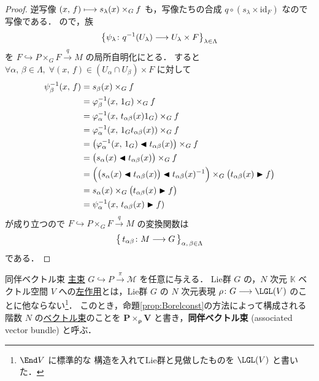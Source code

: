 \documentclass[geometry_main]{subfiles}
\begin{document}
\begin{proof}
{        逆写像 $(x,\, f) \longmapsto s_\lambda(x) \times_G f$ も，\cinfty 写像たちの合成 $q \circ (s_\lambda \times \mathrm{id}_F)$ なので \cinfty 写像である．
    }
    ので，族 
    \begin{align}
        \bigl\{ \psi_\lambda \colon q^{-1}(U_\lambda) \longrightarrow U_\lambda \times F \bigr\}_{\lambda \in \Lambda}
    \end{align}
    を $F \hookrightarrow P \times_G F \xrightarrow{q} M$ の局所自明化にとる．
    すると $\forall \alpha,\, \beta \in \Lambda,\; \forall (x,\, f) \in (U_\alpha \cap U_\beta) \times F$ に対して
    \begin{align}
        \psi_\beta^{-1} (x,\, f) &= s_\beta(x) \times_G f \\
        &= \varphi_\beta^{-1}(x,\, 1_G) \times_G f \\
        &= \varphi_\alpha^{-1}(x,\, t_{\alpha\beta}(x)1_G) \times_G f \\
        &= \varphi_\alpha^{-1}(x,\, 1_G t_{\alpha\beta}(x)) \times_G f \\
        &= \bigl(\varphi_\alpha^{-1}(x,\, 1_G) \blacktriangleleft t_{\alpha\beta}(x)\bigr) \times_G f \\
        &= \bigl(s_\alpha (x) \blacktriangleleft t_{\alpha\beta}(x)\bigr) \times_G f \\
        &= \Bigl( \bigl(s_\alpha (x) \blacktriangleleft t_{\alpha\beta}(x)\bigr) \blacktriangleleft t_{\alpha\beta}(x)^{-1} \Bigr) \times_G \bigl(t_{\alpha\beta}(x) \blacktriangleright f\bigr) \\
        &= s_\alpha (x) \times_G \bigl( t_{\alpha\beta}(x) \blacktriangleright f \bigr) \\
        &= \psi_\alpha^{-1} (x,\, t_{\alpha\beta}(x) \blacktriangleright f)
    \end{align}
    が成り立つので $F \hookrightarrow P \times_G F \xrightarrow{q} M$ の変換関数は
    \begin{align}
        \bigl\{\, t_{\alpha\beta} \colon M \longrightarrow G  \,\bigr\}_{\alpha,\, \beta \in \Lambda}
    \end{align}
    である．
\end{proof}

\begin{myexample}[label=def:associated-vect]{同伴ベクトル束}
    \hyperref[def.fiber-1]{主束} $G \hookrightarrow P \xrightarrow{\pi} \mathcal{M}$ を任意に与える．
    Lie群 $G$ の，$N$ 次元 $\mathbb{K}$ ベクトル空間 $V$ への\hyperref[def:Lie-action]{左作用}とは，Lie群 $G$ の $N$ 次元表現 $\rho \colon G \lto \LGL (V)$ のことに他ならない\footnote{$\End V$ に標準的な \cinfty 構造を入れてLie群と見做したものを $\LGL (V)$ と書いた．}．
    このとき，命題\ref{prop:Borelconst}の方法によって構成される階数 $N$ の\hyperref[def:vect]{ベクトル束}のことを $\bm{P \times_\rho V}$ と書き，\textbf{同伴ベクトル束} (associated vector bundle) と呼ぶ．
\end{myexample}
\end{document}
